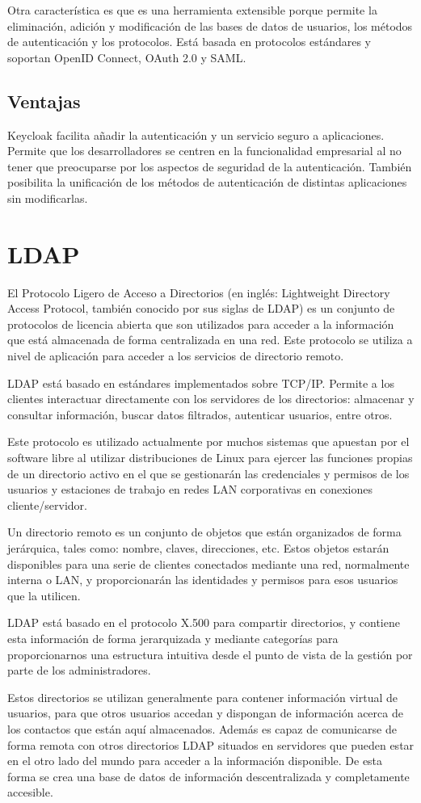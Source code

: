 	Otra característica es que es una herramienta extensible porque permite la eliminación, adición y modificación de las bases de datos de usuarios, los métodos de autenticación y los protocolos. Está basada en protocolos estándares y soportan OpenID Connect, OAuth 2.0 y SAML.
	
	\subsection{Ventajas}
	Keycloak facilita añadir la autenticación y un servicio seguro a aplicaciones. Permite que los desarrolladores se centren en la funcionalidad empresarial al no tener que preocuparse por los aspectos de seguridad de la autenticación. También posibilita la unificación de los métodos de autenticación de distintas aplicaciones sin modificarlas.
	
\section{LDAP}
El Protocolo Ligero de Acceso a Directorios (en inglés: Lightweight Directory Access Protocol, también conocido por sus siglas de LDAP) es un conjunto de protocolos de licencia abierta que son utilizados para acceder a la información que está almacenada de forma centralizada en una red. Este protocolo se utiliza a nivel de aplicación para acceder a los servicios de directorio remoto.

LDAP está basado en estándares implementados sobre TCP/IP. Permite a los clientes interactuar directamente con los servidores de los directorios: almacenar y consultar información, buscar datos filtrados, autenticar usuarios, entre otros.

Este protocolo es utilizado actualmente por muchos sistemas que apuestan por el software libre al utilizar distribuciones de Linux para ejercer las funciones propias de un directorio activo en el que se gestionarán las credenciales y permisos de los usuarios y estaciones de trabajo en redes LAN corporativas en conexiones cliente/servidor.

Un directorio remoto es un conjunto de objetos que están organizados de forma jerárquica, tales como: nombre, claves, direcciones, etc. Estos objetos estarán disponibles para una serie de clientes conectados mediante una red, normalmente interna o LAN, y proporcionarán las identidades y permisos para esos usuarios que la utilicen.

LDAP está basado en el protocolo X.500 para compartir directorios, y contiene esta información de forma jerarquizada y mediante categorías para proporcionarnos una estructura intuitiva desde el punto de vista de la gestión por parte de los administradores.

Estos directorios se utilizan generalmente para contener información virtual de usuarios, para que otros usuarios accedan y dispongan de información acerca de los contactos que están aquí almacenados. Además es capaz de comunicarse de forma remota con otros directorios LDAP situados en servidores que pueden estar en el otro lado del mundo para acceder a la información disponible. De esta forma se crea una base de datos de información descentralizada y completamente accesible.